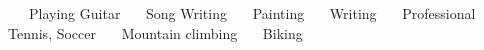 

\bullet ~~~Playing Guitar
\bullet ~~~Song Writing
\bullet ~~~Painting
\bullet ~~~Writing
\bullet ~~~Professional Tennis, Soccer
\bullet ~~~Mountain climbing
\bullet ~~~Biking
\vspace{0.01cm}